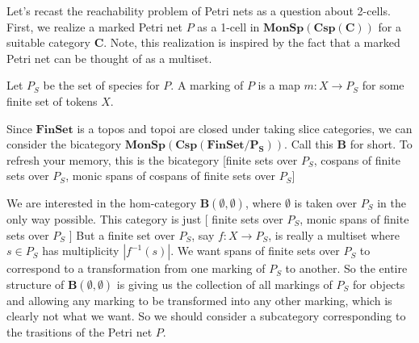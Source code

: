 \documentclass[11pt]{amsart}
\newcommand{\cat}[1]{\mathbf{#1}}
\newcommand{\from}{\colon}
\theoremstyle{remark}
\theoremstyle{definition}
\begin{document}
	
Let's recast the 
reachability problem 
of Petri nets
as a question about 
2-cells.
First, we realize
a marked Petri net $P$
as a 1-cell in 
$\cat{MonSp(Csp(C))}$
for a suitable category $\cat{C}$.
Note, this realization
is inspired by the fact 
that a marked Petri net 
can be thought of as a multiset.

Let $P_S$ be the set of species
for $P$.  A marking of $P$ is a
map $m \from X \to P_S$ for some
finite set of tokens $X$. 

Since $\cat{FinSet}$ is a topos
and topoi are closed under
taking slice categories,
we can consider the bicategory
$\cat{MonSp ( Csp ( FinSet / P_S ) ) }$.
Call this $\cat{B}$ for short.
To refresh your memory,
this is the bicategory 
[finite sets over $P_S$,
cospans of finite sets over $P_S$,
monic spans of cospans of finite sets over $P_S$]

We are interested in the hom-category 
$\cat{B}( \emptyset , \emptyset )$,
where $\emptyset$ is taken over $P_S$
in the only way possible.
This category is just
[ finite sets over $P_S$,
 monic spans of finite sets over $P_S$ ]
But a finite set over $P_S$, 
say $f \from X \to P_S$, 
is really a multiset where
$s \in P_S$ has multiplicity
$| f^{-1} ( s ) |$.
We want spans of finite sets over $P_S$ 
to correspond to a transformation
from one marking of $P_S$ to another.
So the entire structure of 
$\cat{B}( \emptyset , \emptyset )$
is giving us the collection of 
all markings of $P_S$ for objects
and allowing any marking to
be transformed into any other marking,
which is clearly not what we want.
So we should consider a subcategory
corresponding to the trasitions
of the Petri net $P$.
\end{document}
